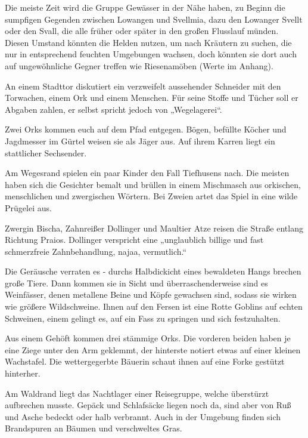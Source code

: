 Die meiste Zeit wird die Gruppe Gewässer in der Nähe haben, zu Beginn die sumpfigen Gegenden zwischen Lowangen und Svellmia, dazu den Lowanger Svellt oder den Svall, die alle früher oder später in den großen Flusslauf münden. Diesen Umstand könnten die Helden nutzen, um nach Kräutern zu suchen, die nur in entsprechend feuchten Umgebungen wachsen, doch könnten sie dort auch auf ungewöhnliche Gegner treffen wie Riesenamöben (Werte im Anhang).




An einem Stadttor diskutiert ein verzweifelt aussehender Schneider mit den Torwachen, einem Ork und einem Menschen. Für seine Stoffe und Tücher soll er Abgaben zahlen, er selbst spricht jedoch von „Wegelagerei“.


Zwei Orks kommen euch auf dem Pfad entgegen. Bögen, befüllte Köcher und Jagdmesser im Gürtel weisen sie als Jäger aus. Auf ihrem Karren liegt ein stattlicher Sechsender.


Am Wegesrand spielen ein paar Kinder den Fall Tiefhusens nach. Die meisten haben sich die Gesichter bemalt und brüllen in einem Mischmasch aus orkischen, menschlichen und zwergischen Wörtern. Bei Zweien artet das Spiel in eine wilde Prügelei aus.


Zwergin Bischa, Zahnreißer Dollinger und Maultier Atze reisen die Straße entlang Richtung Praios. Dollinger verspricht eine „unglaublich billige und fast schmerzfreie Zahnbehandlung, najaa, vermutlich.“


Die Geräusche verraten es - durchs Halbdickicht eines bewaldeten Hangs brechen große Tiere. Dann kommen sie in Sicht und überraschenderweise sind es Weinfässer, denen metallene Beine und Köpfe gewachsen sind, sodass sie wirken wie größere Wildschweine. Ihnen auf den Fersen ist eine Rotte Goblins auf echten Schweinen, einem gelingt es, auf ein Fass zu springen und sich festzuhalten.

Aus einem Gehöft kommen drei stämmige Orks. Die vorderen beiden haben je eine Ziege unter den Arm geklemmt, der hinterste notiert etwas auf einer kleinen Wachstafel. Die wettergegerbte Bäuerin schaut ihnen auf eine Forke gestützt hinterher.

Am Waldrand liegt das Nachtlager einer Reisegruppe, welche überstürzt aufbrechen musste. Gepäck und Schlafsäcke liegen noch da, sind aber von Ruß und Asche bedeckt oder halb verbrannt. Auch in der Umgebung finden sich Brandspuren an Bäumen und verschweltes Gras. 


